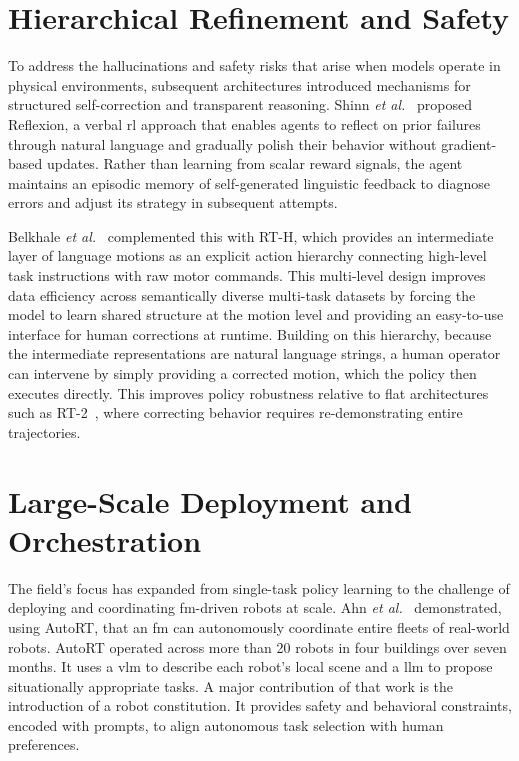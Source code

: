 \documentclass[
     12pt,
     a4paper,
     BCOR=10mm,
     DIV=14,
     listof=totoc,
     bibliography=totoc,
     parskip,
     twoside,
     headsepline
     ]{scrreprt}
\begin{document}
\section{Hierarchical Refinement and Safety}\label{sec:refinement_and_safety}
To address the hallucinations and safety risks that arise when models operate in physical environments, subsequent architectures introduced mechanisms for structured self-correction and transparent reasoning. Shinn \emph{et al.}~\cite{shinn2023reflexionlanguageagentsverbal} proposed Reflexion, a verbal \gls{rl} approach that enables agents to reflect on prior failures through natural language and gradually polish their behavior without gradient-based updates. Rather than learning from scalar reward signals, the agent maintains an episodic memory of self-generated linguistic feedback to diagnose errors and adjust its strategy in subsequent attempts.

Belkhale \emph{et al.}~\cite{belkhale2024rthactionhierarchiesusing} complemented this with RT-H, which provides an intermediate layer of language motions as an explicit action hierarchy connecting high-level task instructions with raw motor commands. This multi-level design improves data efficiency across semantically diverse multi-task datasets by forcing the model to learn shared structure at the motion level and providing an easy-to-use interface for human corrections at runtime. Building on this hierarchy, because the intermediate representations are natural language strings, a human operator can intervene by simply providing a corrected motion, which the policy then executes directly. This improves policy robustness relative to flat architectures such as RT-2~\cite{brohan2023rt2visionlanguageactionmodelstransfer}, where correcting behavior requires re-demonstrating entire trajectories.

\section{Large-Scale Deployment and Orchestration}
The field's focus has expanded from single-task policy learning to the challenge of deploying and coordinating \gls{fm}-driven robots at scale. Ahn \emph{et al.}~\cite{ahn2024autortembodiedfoundationmodels} demonstrated, using AutoRT, that an \gls{fm} can autonomously coordinate entire fleets of real-world robots. AutoRT operated across more than 20 robots in four buildings over seven months. It uses a \gls{vlm} to describe each robot's local scene and a \gls{llm} to propose situationally appropriate tasks. A major contribution of that work is the introduction of a robot constitution. It provides safety and behavioral constraints, encoded with prompts, to align autonomous task selection with human preferences.
\end{document}
